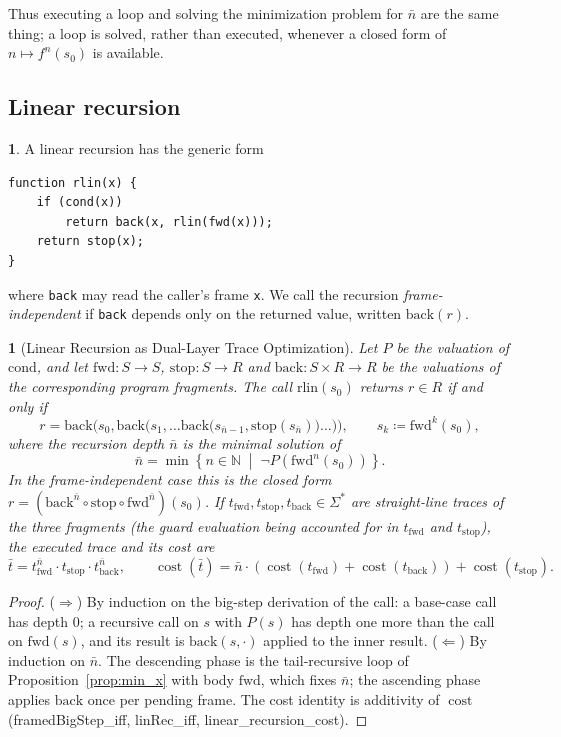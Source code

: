\documentclass[oneside,english]{amsart}
\numberwithin{equation}{section}
\numberwithin{figure}{section}
\theoremstyle{plain}
\theoremstyle{definition}
\theoremstyle{plain}
\newtheorem{prop}[thm]{\protect\propositionname}
\theoremstyle{remark}
\theoremstyle{plain}
\theoremstyle{definition}
\newtheorem*{defn*}{\protect\definitionname}
\theoremstyle{plain}
\theoremstyle{remark}
\DeclareMathOperator{\cost}{cost}
\newcommand{\lean}[1]{{\ttfamily\small #1}}
\providecommand{\definitionname}{Definition}
\providecommand{\propositionname}{Proposition}
\begin{document}
Thus executing a loop and solving the minimization problem for $\bar{n}$ are the same thing; a loop is solved, rather than executed, whenever a closed form of $n \mapsto f^n(s_0)$ is available.

\subsection{Linear recursion}

\begin{defn*}
A linear recursion has the generic form
\begin{lstlisting}
function rlin(x) {
    if (cond(x))
        return back(x, rlin(fwd(x)));
    return stop(x);
}
\end{lstlisting}
where \texttt{back} may read the caller's frame \texttt{x}. We call the recursion \textit{frame-independent} if \texttt{back} depends only on the returned value, written $\text{back}(r)$.
\end{defn*}

\begin{prop}[Linear Recursion as Dual-Layer Trace Optimization]
\label{prop:linrec}
Let $P$ be the valuation of $\text{cond}$, and let $\text{fwd} : S \to S$, $\text{stop} : S \to R$ and $\text{back} : S \times R \to R$ be the valuations of the corresponding program fragments. The call $\text{rlin}(s_0)$ returns $r \in R$ if and only if
\[
r = \text{back}\bigl(s_0, \text{back}\bigl(s_1, \dots \text{back}\bigl(s_{\bar{n}-1}, \text{stop}(s_{\bar{n}})\bigr) \dots \bigr)\bigr), \qquad s_k \coloneqq \text{fwd}^k(s_0),
\]
where the recursion depth $\bar{n}$ is the minimal solution of
\[
\bar{n} = \min \left\{ n \in \mathbb{N} \;\middle|\; \neg P\left(\text{fwd}^n(s_0)\right) \right\}.
\]
In the frame-independent case this is the closed form $r = \left(\text{back}^{\bar{n}} \circ \text{stop} \circ \text{fwd}^{\bar{n}}\right)(s_0)$. If $t_{\text{fwd}}, t_{\text{stop}}, t_{\text{back}} \in \Sigma^*$ are straight-line traces of the three fragments (the guard evaluation being accounted for in $t_{\text{fwd}}$ and $t_{\text{stop}}$), the executed trace and its cost are
\[
\bar{t} = t_{\text{fwd}}^{\bar{n}} \cdot t_{\text{stop}} \cdot t_{\text{back}}^{\bar{n}}, \qquad \cost(\bar{t}) = \bar{n} \cdot \left(\cost(t_{\text{fwd}}) + \cost(t_{\text{back}})\right) + \cost(t_{\text{stop}}).
\]
\end{prop}

\begin{proof}
($\Rightarrow$) By induction on the big-step derivation of the call: a base-case call has depth $0$; a recursive call on $s$ with $P(s)$ has depth one more than the call on $\text{fwd}(s)$, and its result is $\text{back}(s, \cdot)$ applied to the inner result. ($\Leftarrow$) By induction on $\bar{n}$. The descending phase is the tail-recursive loop of Proposition~\ref{prop:min_x} with body $\text{fwd}$, which fixes $\bar{n}$; the ascending phase applies $\text{back}$ once per pending frame. The cost identity is additivity of $\cost$ (\lean{framedBigStep\_\allowbreak iff}, \lean{linRec\_\allowbreak iff}, \lean{linear\_\allowbreak recursion\_\allowbreak cost}).
\end{proof}
\end{document}
